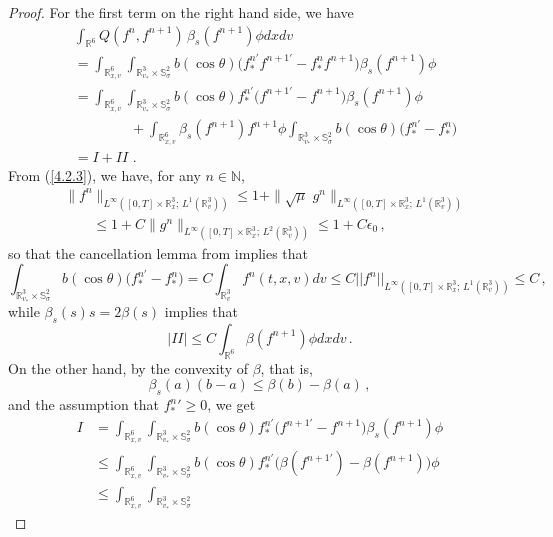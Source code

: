 \documentclass{amsart}[12pt, article]
\begin{document}
\begin{proof}
For the first term on the right hand side, we have
\begin{align*}
&\int_{{{{\mathbb R}}}^6} Q(f^n, f^{n+1} )\, \beta_s(f^{n+1})\phi  dxdv\\
& =  \int_{{{{\mathbb R}}}^6_{x, v}}\int_{{{{\mathbb R}}}^3_{v_*}\times{\mathbb{S}}^2_\sigma}
b(\cos\theta) \Big( f^{n '}_\ast f^{n+1 '}
 - f^n_\ast f^{n+1} \Big) \beta_s (f^{n+1})\phi \\
&= \int_{{{{\mathbb R}}}^6_{x, v}}\int_{{{{\mathbb R}}}^3_{v_*}\times{\mathbb{S}}^2_\sigma}
b(\cos\theta) f^{n '}_\ast \Big( f^{n+1 '}
 -f^{n+1}\Big) \beta_s(f^{n+1}) \phi \\
 &\qquad\qquad+  \int_{{{{\mathbb R}}}^6_{x, v}}\beta_s(f^{n+1} )
 f^{n+1} \phi \int_{{{{\mathbb R}}}^3_{v_*}\times{\mathbb{S}}^2_\sigma}
 b(\cos\theta) \Big(f^{n '}_\ast -f^n_\ast \Big)\\
&=I+II \,\, .
\end{align*}
{}From (\ref{4.2.3}), we have, for any $n\in{{\mathbb N}}$,
\begin{align*}
&\|f^n\|_{L^\infty([0, T]\times{{{\mathbb R}}}^3_x;\, L^1({{{\mathbb R}}}^3_v))} \leq 1 +
\|\sqrt\mu\,\, g^n\|_{L^\infty([0, T]\times{{{\mathbb R}}}^3_x;\,
L^1({{{\mathbb R}}}^3_v))}\\
&\qquad\leq 1 + C\|g^n\|_{L^\infty([0, T]\times{{{\mathbb R}}}^3_x;\,
L^2({{{\mathbb R}}}^3_v))}\leq 1+C\epsilon_0\, ,
\end{align*}
so that the cancellation lemma {}from \cite{al-1} implies that
$$\int_{{{{\mathbb R}}}^3_{v_*}\times{\mathbb{S}}^2_\sigma}
 b(\cos\theta) \Big(f^{n '}_\ast -f^n_\ast \Big) =C \int_{{{{\mathbb R}}}^3_{v}}
 f^n (t,x,v) dv \leq C || f^n||_{L^\infty([0, T]\times{{{\mathbb R}}}^3_x;\, L^1({{{\mathbb R}}}^3_v))}
 \leq C\, ,
 $$
while $\beta_s (s) s =2 \beta (s)$ implies that
$$
|II|\leq C \int_{{{{\mathbb R}}}^6}  \beta (f^{n+1}) \phi dxdv\, .
$$
On the other hand, by the convexity of $\beta$, that is,
$$
\beta_s(a)(b-a)\leq \beta(b)-\beta(a)\,,
$$
and the assumption that ${f_*^n}' \geq 0$, we get
\begin{align*}
I&=\int_{{{{\mathbb R}}}^6_{x, v}}\int_{{{{\mathbb R}}}^3_{v_*}\times{\mathbb{S}}^2_\sigma}
b(\cos\theta) f^{n '}_\ast \Big( f^{n+1 '}
 -f^{n+1}\Big) \beta_s(f^{n+1}) \phi \\
&\leq \int_{{{{\mathbb R}}}^6_{x, v}}\int_{{{{\mathbb R}}}^3_{v_*}\times{\mathbb{S}}^2_\sigma}
b(\cos\theta) f^{n '}_\ast \Big( \beta (f^{n+1 '})
 - \beta (f^{n+1}) \Big) \phi \\
 &\leq \int_{{{{\mathbb R}}}^6_{x, v}}\int_{{{{\mathbb R}}}^3_{v_*}\times{\mathbb{S}}^2_\sigma}

\end{align*}
\end{proof}
\end{document}
